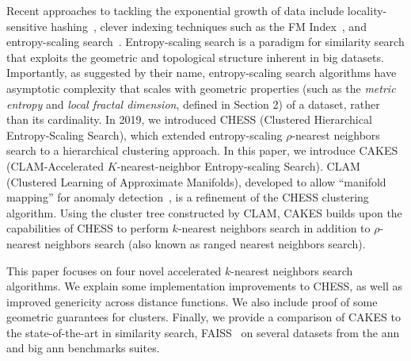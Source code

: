 Recent approaches to tackling the exponential growth of data include locality-sensitive hashing~\cite{bingham2001random}, 
clever indexing techniques such as the FM Index~\cite{ferragina2005indexing}, and entropy-scaling search~\cite{yu2015entropy, ishaq2019clustered}. 
Entropy-scaling search is a paradigm for similarity search that exploits the geometric and topological structure inherent in big datasets.
Importantly, as suggested by their name, entropy-scaling search algorithms have asymptotic complexity that scales with geometric properties (such as the 
\emph{metric entropy} and \emph{local fractal dimension}, defined in Section 2) of a dataset,
rather than its cardinality. In 2019, we introduced CHESS (Clustered Hierarchical Entropy-Scaling Search), which extended entropy-scaling $\rho$-nearest 
neighbors search to a hierarchical clustering approach. In this paper, we introduce CAKES (CLAM-Accelerated $K$-nearest-neighbor 
Entropy-scaling Search). CLAM (Clustered Learning of Approximate Manifolds), developed to allow ``manifold mapping'' for anomaly detection~\cite{ishaq2021clustered}, is a refinement of the CHESS clustering algorithm. 
Using the cluster tree constructed by CLAM, CAKES builds upon the capabilities of CHESS to perform 
$k$-nearest neighbors search in addition to $\rho$-nearest neighbors search (also known as ranged nearest neighbors search).


This paper focuses on four novel accelerated $k$-nearest neighbors search algorithms. We explain some 
implementation improvements to CHESS, as well as improved genericity across distance functions. 
We also include proof of some geometric guarantees for clusters. Finally, we provide a comparison of 
CAKES to the state-of-the-art in similarity search, FAISS~\cite{johnson2019billion} on several datasets 
from the ann and big ann benchmarks suites. 